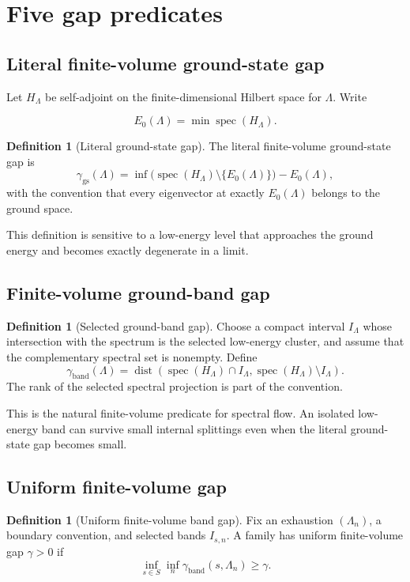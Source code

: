 \documentclass[12pt]{article}
\theoremstyle{definition}
\newtheorem{definition}[theorem]{Definition}
\theoremstyle{remark}
\newcommand{\spec}{\operatorname{spec}}
\newcommand{\dist}{\operatorname{dist}}
\begin{document}
\section{Five gap predicates}

\subsection{Literal finite-volume ground-state gap}

Let $H_\Lambda$ be self-adjoint on the finite-dimensional Hilbert space for
$\Lambda$. Write

\[
E_0(\Lambda)=\min\spec(H_\Lambda).
\]

\begin{definition}[Literal ground-state gap]
The literal finite-volume ground-state gap is
\[
\gamma_{\mathrm{gs}}(\Lambda)
=
\inf\bigl(\spec(H_\Lambda)\setminus\{E_0(\Lambda)\}\bigr)
-E_0(\Lambda),
\]
with the convention that every eigenvector at exactly $E_0(\Lambda)$ belongs
to the ground space.
\end{definition}

This definition is sensitive to a low-energy level that approaches the ground
energy and becomes exactly degenerate in a limit.

\subsection{Finite-volume ground-band gap}

\begin{definition}[Selected ground-band gap]
Choose a compact interval $I_\Lambda$ whose intersection with the spectrum is
the selected low-energy cluster, and assume that the complementary spectral
set is nonempty. Define
\[
\gamma_{\mathrm{band}}(\Lambda)
=
\dist\left(
\spec(H_\Lambda)\cap I_\Lambda,
\spec(H_\Lambda)\setminus I_\Lambda
\right).
\]
The rank of the selected spectral projection is part of the convention.
\end{definition}

This is the natural finite-volume predicate for spectral flow. An isolated
low-energy band can survive small internal splittings even when the literal
ground-state gap becomes small.

\subsection{Uniform finite-volume gap}

\begin{definition}[Uniform finite-volume band gap]
Fix an exhaustion $(\Lambda_n)$, a boundary convention, and selected bands
$I_{s,n}$. A family has uniform finite-volume gap $\gamma>0$ if
\[
\inf_{s\in S}\inf_n
\gamma_{\mathrm{band}}(s,\Lambda_n)
\geq\gamma.
\]
\end{definition}
\end{document}
